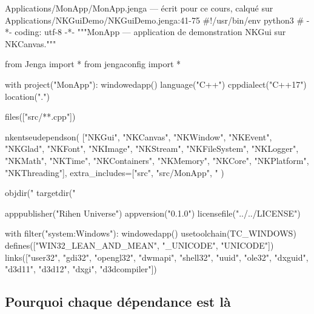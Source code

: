 \begin{nkcode}{Applications/MonApp/MonApp.jenga — écrit pour ce cours, calqué sur Applications/NKGuiDemo/NKGuiDemo.jenga:41-75}
#!/usr/bin/env python3
# -*- coding: utf-8 -*-
"""MonApp — application de demonstration NKGui sur NKCanvas."""

from Jenga import *
from jengaconfig import *

with project("MonApp"):
    windowedapp()
    language("C++")
    cppdialect("C++17")
    location(".")

    files(["src/**.cpp"])

    nkentseudependson(
        ["NKGui", "NKCanvas", "NKWindow", "NKEvent", "NKGlad", "NKFont", "NKImage",
         "NKStream", "NKFileSystem", "NKLogger", "NKMath", "NKTime",
         "NKContainers", "NKMemory", "NKCore", "NKPlatform", "NKThreading"],
        extra_includes=["src", "src/MonApp", "%
    )

    objdir("%
    targetdir("%

    apppublisher("Rihen Universe")
    appversion("0.1.0")
    licensefile("../../LICENSE")

    with filter("system:Windows"):
        windowedapp()
        usetoolchain(TC_WINDOWS)
        defines(["WIN32_LEAN_AND_MEAN", "_UNICODE", "UNICODE"])
        links(["user32", "gdi32", "opengl32", "dwmapi", "shell32",
               "uuid", "ole32", "dxguid",
               "d3d11", "d3d12", "dxgi", "d3dcompiler"])
\end{nkcode}

\subsection{Pourquoi chaque dépendance est là}

